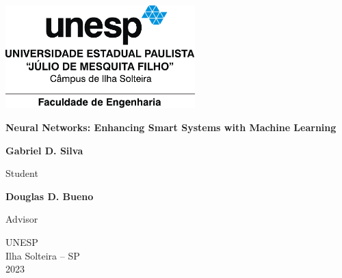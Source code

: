\begin{titlepage}
    
\centering
\includegraphics[width=0.55\textwidth]{figures/logos/unesp-acessorio.pdf}



\vfill
\sffamily
{\LARGE\bfseries Neural Networks: Enhancing Smart Systems with Machine Learning}



\vfill

\textbf{Gabriel D. Silva}

Student

\textbf{Douglas D. Bueno}

Advisor



\vfill

UNESP \\
Ilha Solteira -- SP \\
2023
\end{titlepage}


     
     
     
     
     
     
     
      
